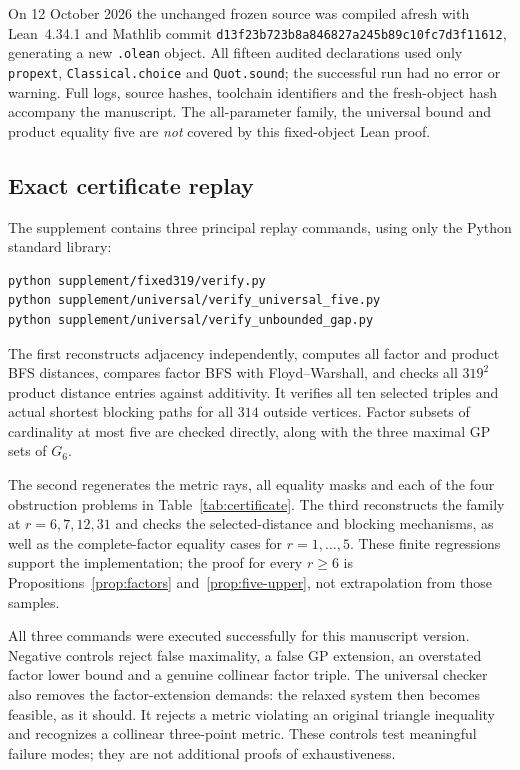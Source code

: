 \documentclass[11pt]{article}
\theoremstyle{definition}
\theoremstyle{remark}
\begin{document}
On 12 October 2026 the unchanged frozen source was compiled afresh with
Lean~4.34.1 and Mathlib commit
\texttt{d13f23b723b8a846827a245b89c10fc7d3f11612}, generating a new
\texttt{.olean} object. All fifteen audited declarations used only
\texttt{propext}, \texttt{Classical.choice} and \texttt{Quot.sound}; the
successful run had no error or warning. Full logs, source hashes, toolchain
identifiers and the fresh-object hash accompany the manuscript.
The all-parameter family, the universal bound and product equality five
are \emph{not} covered by this fixed-object Lean proof.

\subsection{Exact certificate replay}

The supplement contains three principal replay commands, using only the
Python standard library:
\begin{lstlisting}
python supplement/fixed319/verify.py
python supplement/universal/verify_universal_five.py
python supplement/universal/verify_unbounded_gap.py
\end{lstlisting}
The first reconstructs adjacency independently, computes all factor and
product BFS distances, compares factor BFS with Floyd--Warshall, and checks
all $319^2$ product distance entries against additivity. It verifies
all ten selected triples and actual shortest blocking paths for all
$314$ outside vertices. Factor subsets of cardinality at most five are
checked directly, along with the three maximal GP sets of $G_6$.

The second regenerates the metric rays, all equality masks and each of
the four obstruction problems in Table~\ref{tab:certificate}. The third
reconstructs the family at $r=6,7,12,31$ and checks the selected-distance
and blocking mechanisms, as well as the complete-factor equality cases
for $r=1,\ldots,5$. These finite regressions support the implementation;
the proof for every $r\geq6$ is Propositions~\ref{prop:factors}
and~\ref{prop:five-upper}, not extrapolation from those samples.

All three commands were executed successfully for this manuscript version.
Negative controls reject false maximality, a false GP extension, an
overstated factor lower bound and a genuine collinear factor triple.
The universal checker also removes the factor-extension demands: the
relaxed system then becomes feasible, as it should. It rejects a metric
violating an original triangle inequality and recognizes a collinear
three-point metric. These controls test meaningful failure modes; they
are not additional proofs of exhaustiveness.
\end{document}
